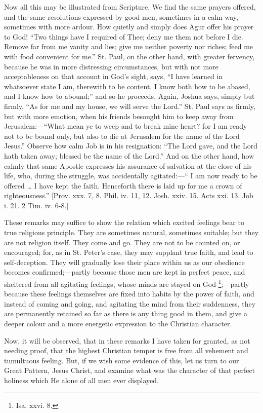 Now all this may be illustrated from Scripture. We
find the same prayers offered, and the same resolutions
expressed by good men, sometimes in a calm way, sometimes
with more ardour. How quietly and simply does Agur offer
his prayer to God! ``Two things have I required of
Thee; deny me them not before I die. Remove far from me
vanity and lies; give me neither poverty nor riches; feed
me with food convenient for me.'' St. Paul, on the
other hand, with greater fervency, because he was in more
distressing circumstances, but with not more
acceptableness on that account in God's sight, says,
``I have learned in whatsoever state I am, therewith
to be content. I know both how to be abased, and I know
how to abound;'' and so he proceeds. Again, Joshua
says, simply but firmly, ``As for me and my house, we
will serve the Lord.'' St. Paul says as firmly, but
with more emotion, when his friends besought him to keep
away from Jerusalem:—``What mean ye to weep and
to break mine heart? for I am ready not to be bound only,
but also to die at Jerusalem for the name of the Lord
Jesus.'' Observe how calm Job is in his resignation:
``The Lord gave, and the Lord hath taken away;
blessed be the name of the Lord.'' And on the other
hand, how calmly that same Apostle expresses his
assurance of salvation at the close of his life, who,
during the struggle, was accidentally
agitated:—`` I am now ready to be offered …
I have kept the faith. Henceforth there is laid up for me
a crown of righteousness.'' [Prov. xxx. 7, 8. Phil.
iv. 11, 12. Josh. xxiv. 15. Acts xxi. 13. Job i. 21. 2
Tim. iv. 6-8.]

These remarks may suffice to show the relation which
excited feelings bear to true religious principle. They
are sometimes natural, sometimes suitable; but they are
not religion itself. They come and go. They are not to be
counted on, or encouraged; for, as in St. Peter's case,
they may supplant true faith, and lead to self-deception.
They will gradually lose their place within us as our
obedience becomes confirmed;—partly because those
men are kept in perfect peace, and sheltered from all
agitating feelings, whose minds are stayed on God \footnote{Isa. xxvi. 8.};—partly because these feelings themselves
are fixed into habits by the power of faith, and instead
of coming and going, and agitating the mind from their
suddenness, they are permanently retained so far as there
is any thing good in them, and give a deeper colour and a
more energetic expression to the Christian character.

Now, it will be observed, that in these remarks I have
taken for granted, as not needing proof, that the highest
Christian temper is free from all vehement and tumultuous
feeling. But, if we wish some evidence of this, let us
turn to our Great Pattern, Jesus Christ, and examine what
was the character of that perfect holiness which He alone
of all men ever displayed.


